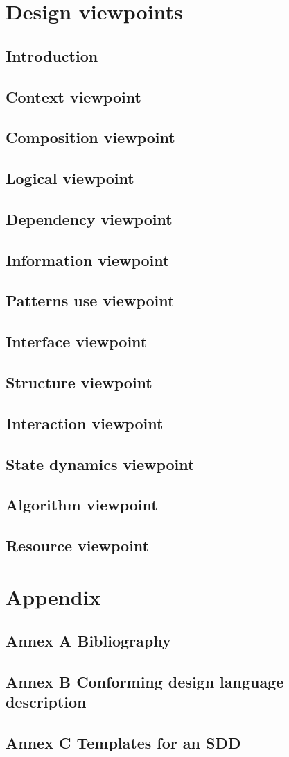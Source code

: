 \documentclass[compsoc,draftclsnofoot,onecolumn,10pt]{IEEEtran}
\begin{document}
\section{Design viewpoints}
\subsection{Introduction} 
\subsection{Context viewpoint} 
\subsection{Composition viewpoint} 
\subsection{Logical viewpoint} 
\subsection{Dependency viewpoint} 
\subsection{Information viewpoint} 
\subsection{Patterns use viewpoint} 
\subsection{Interface viewpoint} 
\subsection{Structure viewpoint} 
\subsection{Interaction viewpoint} 
\subsection{State dynamics viewpoint} 
\subsection{Algorithm viewpoint} 
\subsection{Resource viewpoint}

\section{Appendix}
\subsection{Annex A  Bibliography} 



\subsection{Annex B  Conforming design language description} 
\subsection{Annex C Templates for an SDD}
\end{document}
